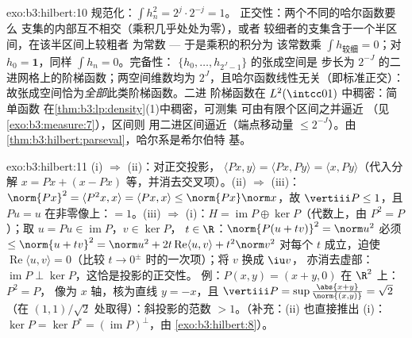 \begin{solution}{exo:b3:hilbert:10}
规范化：$\int h_n^2 = 2^j\cdot 2^{-j} = 1$。
正交性：两个不同的哈尔函数要么
支集的内部互不相交（乘积几乎处处为零），或者
较细者的支集含于一个半区间，在该半区间上较粗者
为常数 --- 于是乘积的积分为
该常数乘 $\int h_{\text{较细}} = 0$；对 $h_0
= \mathbf 1$，同样 $\int h_n = 0$。完备性：
$\{h_0, \dots, h_{2^J-1}\}$ 的张成空间是
步长为 $2^{-J}$ 的二进网格上的阶梯函数；两空间维数均为
$2^J$，且哈尔函数线性无关（即标准正交）：
故张成空间恰为\emph{全部}此类阶梯函数。二进
阶梯函数在 $L^2(\intcc01)$ 中稠密：简单函数
在\cref{thm:b3:lp:density}(1)中稠密，可测集
可由有限个区间之并逼近
（见\cref{exo:b3:measure:7}），区间则
用二进区间逼近（端点移动量 $\leq 2^{-J}$）。由
\cref{thm:b3:hilbert:parseval}，哈尔系是希尔伯特
基。
\end{solution}

\begin{solution}{exo:b3:hilbert:11}
(i) $\Rightarrow$ (ii)：对正交投影，
$\langle Px, y\rangle = \langle Px, Py\rangle = \langle x,
Py\rangle$（代入分解 $x = Px + (x - Px)$
等，并消去交叉项）。(ii) $\Rightarrow$ (iii)：
$\norm{Px}^2 = \langle P^2x, x\rangle = \langle Px, x\rangle
\leq \norm{Px}\norm x$，故 $\vertiii P \leq 1$，且 $Pu = u$
在非零像上：$= 1$。(iii) $\Rightarrow$ (i)：$H =
\operatorname{im}P \oplus \ker P$（代数上，由 $P^2
= P$）；取 $u = Pu \in \operatorname{im}P$，$v \in \ker P$，
$t \in \R$：$\norm{P(u + tv)}^2 = \norm u^2$ 必须 $\leq
\norm{u + tv}^2 = \norm u^2 + 2t\operatorname{Re}\langle u,
v\rangle + t^2\norm v^2$ 对每个 $t$ 成立，迫使
$\operatorname{Re}\langle u, v\rangle = 0$（比较
$t \to 0^\pm$ 时的一次项）；将 $v$ 换成 $\iu v$，
亦消去虚部：$\operatorname{im}P \perp
\ker P$，这恰是投影的正交性。
例：$P(x, y) = (x + y, 0)$ 在 $\R^2$ 上：$P^2 = P$，
像为 $x$ 轴，核为直线 $y = -x$，且
$\vertiii P = \sup\frac{\abs{x+y}}{\norm{(x,y)}} = \sqrt2$
（在 $(1,1)/\sqrt2$ 处取得）：斜投影的范数
$> 1$。（补充：(ii) 也直接推出 (i)：
$\ker P = \ker P^* = (\operatorname{im}P)^\perp$，由
\cref{exo:b3:hilbert:8}）。
\end{solution}

